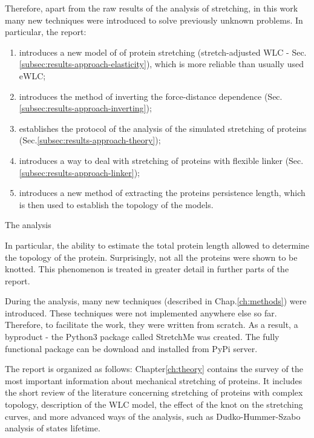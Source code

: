 Therefore, apart from the raw results of the analysis of stretching, in this work many new techniques were introduced to solve previously unknown problems.
In particular, the report:
\begin{enumerate}
    \item introduces a new model of of protein stretching (stretch-adjusted WLC - Sec.\ref{subsec:results-approach-elasticity}), which is more reliable than usually used eWLC;
    \item introduces the method of inverting the force-distance dependence (Sec.\ref{subsec:results-approach-inverting});
    \item establishes the protocol of the analysis of the simulated stretching of proteins (Sec.\ref{subsec:results-approach-theory});
    \item introduces a way to deal with stretching of proteins with flexible linker (Sec.\ref{subsec:results-approach-linker});
    \item introduces a new method of extracting the proteins persistence length, which is then used to establish the topology of the models.
\end{enumerate}

The analysis

In particular, the ability to estimate the total protein length allowed to determine the topology of the protein.
Surprisingly, not all the proteins were shown to be knotted.
This phenomenon is treated in greater detail in further parts of the report.

During the analysis, many new techniques (described in Chap.\ref{ch:methods}) were introduced.
These techniques were not implemented anywhere else so far.
Therefore, to facilitate the work, they were written from scratch.
As a result, a byproduct - the Python3 package called StretchMe was created.
The fully functional package can be download and installed from PyPi server.

The report is organized as follows:
Chapter\ref{ch:theory} contains the survey of the most important information about mechanical stretching of proteins.
It includes the short review of the literature concerning stretching of proteins with complex topology, description of the WLC model, the effect of the knot on the stretching curves, and more advanced ways of the analysis, such as Dudko-Hummer-Szabo analysis of states lifetime.

